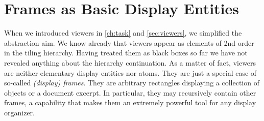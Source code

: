 \section{Frames as Basic Display Entities}
When we introduced viewers in \ref{ch:task} and \ref{sec:viewers},
we simplified the abstraction aim.
We know already that viewers appear as elements of 2nd order in the tiling hierarchy.
Having treated them as black boxes so far
we have not revealed anything about the hierarchy continuation.
As a matter of fact, viewers are neither elementary display entities nor atoms.
They are just a special case of so-called \emph{(display) frames}.
They are arbitrary rectangles displaying a collection of objects or a document excerpt.
In particular, they may recursively contain other frames, a capability
that makes them an extremely powerful tool for any display organizer.

